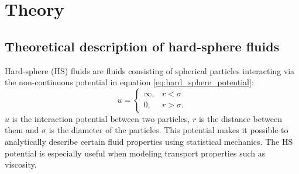 \section{Theory}


\label{sec:theory}
\subsection{Theoretical description of hard-sphere fluids}

Hard-sphere (HS) fluids are fluids consisting of spherical particles interacting via the non-continuous potential in equation \ref{eq:hard_sphere_potential}:
\begin{equation}
    \label{eq:hard_sphere_potential}
    u = 
    \begin{cases}
        \infty, & r < \sigma \\
        0, & r > \sigma.
    \end{cases}
\end{equation}
$u$ is the interaction potential between two particles, $r$ is the distance between them and $\sigma$ is the diameter of the particles. This potential makes it possible to analytically describe certain fluid properties using statistical mechanics. The HS potential is especially useful when modeling transport properties such as viscosity.


